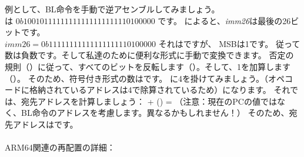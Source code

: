 例として、BL命令を手動で逆アセンブルしてみましょう。\\
は $0b10010111111111111111111110100000$ です。 
 によると、\emph{imm26}は最後の26ビットです。\\
$imm26 = 0b11111111111111111110100000$
それはですが、 \ac{MSB}は1です。
従って数は負数です。そして私達のために便利な形式に手動で変換できます。
否定の規則（）に従って、すべてのビットを反転します（）。そして、1を加算します（）。
そのため、符号付き形式の数はです。 
に4を掛けてみましょう。（オペコードに格納されているアドレスは4で除算されているため）になります。 
それでは、宛先アドレスを計算しましょう： + () = 
（注意：現在の\ac{PC}の値ではなく、BL命令のアドレスを考慮します。異なるかもしれません！）
 そのため、宛先アドレスはです。\\
\\
ARM64関連の再配置の詳細： \ARMELF
